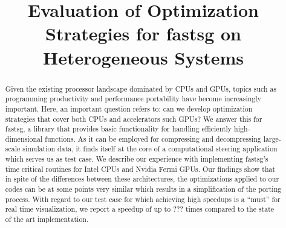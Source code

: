 \documentclass{llncs}
\begin{document}
\title{Evaluation of Optimization Strategies for fastsg on Heterogeneous Systems}
\author{}
\institute{}


\date{}

\maketitle

\begin{abstract}
Given the existing processor landscape dominated by CPUs and GPUs, topics such as programming productivity and performance portability have become increasingly important. Here, an important question refers to: can we develop optimization strategies that cover both CPUs and accelerators such GPUs? 
We answer this for fastsg, a library that provides basic functionality for handling efficiently high-dimensional functions. As it can be employed for compressing and decompressing large-scale simulation data, it finds itself at the core of a computational steering application which serves us as test case. We describe our experience with implementing fastsg's time critical routines for Intel CPUs and Nvidia Fermi GPUs. Our findings show that in spite of the differences between these architectures, the optimizations applied to our codes can be at some points very similar which results in a simplification of the porting process. With regard to our test case for which achieving high speedups is a ``must'' for real time visualization, we report a speedup of up to ??? times compared to the state of the art implementation.
\end{abstract}
\end{document}
